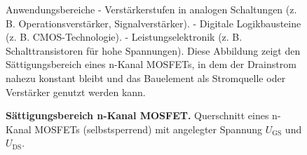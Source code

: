 {\begin{figure}[H]
{            Anwendungsbereiche
            - Verstärkerstufen in analogen Schaltungen (z. B. Operationsverstärker, Signalverstärker).
            - Digitale Logikbausteine (z. B. CMOS-Technologie).
            - Leistungselektronik (z. B. Schalttransistoren für hohe Spannungen).
            Diese Abbildung zeigt den Sättigungsbereich eines n-Kanal MOSFETs, in dem der Drainstrom nahezu konstant bleibt und das Bauelement als Stromquelle oder Verstärker genutzt werden kann.}
        \caption{\textbf{Sättigungsbereich n-Kanal MOSFET.} Querschnitt eines n-Kanal MOSFETs (selbstsperrend) mit angelegter Spannung $U_\mathrm{GS}$ und $U_\mathrm{DS}$.}
        \label{fig:SaettigungsbereichN-KanalMOSFET}
    \end{figure}
}





